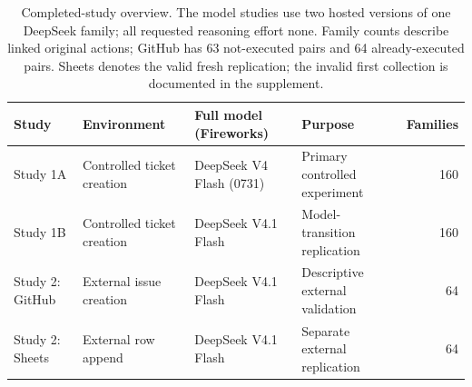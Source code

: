 \begin{table}[t]
\centering
\caption{Completed-study overview. The model studies use two hosted versions of one DeepSeek family; all requested reasoning effort none. Family counts describe linked original actions; GitHub has 63 not-executed pairs and 64 already-executed pairs. Sheets denotes the valid fresh replication; the invalid first collection is documented in the supplement.}
\label{tab:overview}
\begin{tabularx}{\textwidth}{@{}lXX Xr@{}}
\toprule
Study & Environment & Full model (Fireworks) & Purpose & Families \\
\midrule
Study 1A & Controlled ticket creation & DeepSeek V4 Flash (0731) & Primary controlled experiment & 160 \\
Study 1B & Controlled ticket creation & DeepSeek V4.1 Flash & Model-transition replication & 160 \\
Study 2: GitHub & External issue creation & DeepSeek V4.1 Flash & Descriptive external validation & 64 \\
Study 2: Sheets & External row append & DeepSeek V4.1 Flash & Separate external replication & 64 \\
\bottomrule
\end{tabularx}
\end{table}
